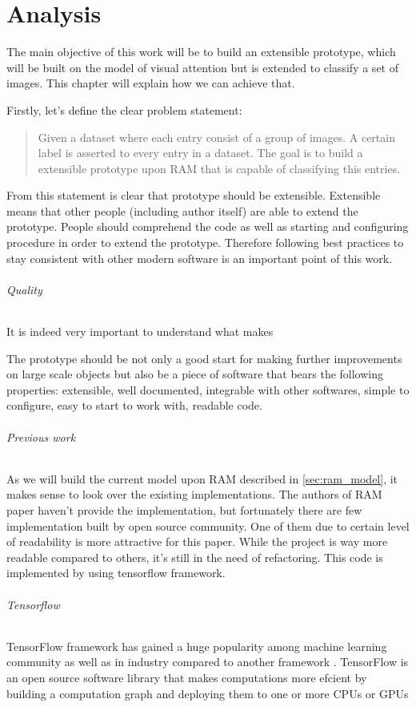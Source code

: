 \chapter{Analysis}

The main objective of this work will be to build an extensible prototype,
which will be built on the model of visual attention but is extended to classify
a set of images. This chapter will explain how we can achieve that.

Firstly, let's define the clear problem statement:
\blockquote{
	Given a dataset where each entry consist of a group of images.
	A certain label is asserted to every entry in a dataset. The goal is
	to build a extensible prototype upon RAM that is capable of classifying this entries.
}

From this statement is clear that prototype should be extensible. Extensible
means that other people (including author itself) are able to extend the
prototype. People should comprehend the code as well as starting and configuring
procedure in order to extend the prototype. Therefore following best practices
to stay consistent with other modern software is an important point of
this work.
\subparagraph{Quality} It is indeed very important to understand what makes

The prototype should be not only a good start for making further improvements
on large scale objects but also be a piece of software that bears the
following properties: extensible, well documented, integrable with other
softwares, simple to configure, easy to start to work with,
readable code.



\subparagraph{Previous work} As we will build the current model upon RAM described
in \autoref{sec:ram_model}, it makes sense to look over the existing implementations.
The authors of RAM paper haven't provide the implementation, but
fortunately there are few implementation built by open source community.
One of them due to certain level of readability is more attractive for this paper.
While the project is way more readable compared to others, it's still in the need
of refactoring.
This code is implemented by using tensorflow framework.

\subparagraph{Tensorflow}

TensorFlow framework has gained a huge popularity among machine learning
community as well as in industry compared to another framework \cite{Goldsborough}.
TensorFlow is an open source software library that makes computations more efcient
by building a computation graph and deploying them to one or more CPUs or GPUs




